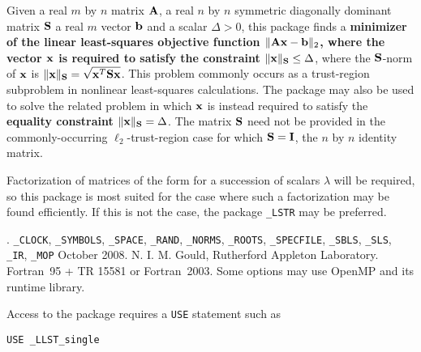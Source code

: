 \documentclass{galahad}
\newcommand{\packagename}{LLST}
\newcommand{\fullpackagename}{\libraryname\_\packagename}
\begin{document}
\galheader


\galsummary
Given a real $m$ by $n$ matrix ${\mathbf{A}}$,
a real $n$ by $n$ symmetric diagonally dominant matrix ${\mathbf{S}}$  
a real $m$ vector ${\mathbf{b}}$ and a scalar $\Delta>0$, this package finds a
{\bf minimizer of the linear least-squares objective function  
$\| {\mathbf{A}} {\mathbf{x}}  - {\mathbf{b}} \|_2$, where the vector ${\mathbf{x}}$ is  
required to satisfy the constraint $\|{\mathbf{x}}\|_{{\mathbf{S}}} \leq  \Delta$},
where the ${\mathbf{S}}$-norm of ${\mathbf{x}}$ is $\|{\mathbf{x}}\|_{{\mathbf{S}}} = \sqrt{{\mathbf{x}}^T {\mathbf{S}} {\mathbf{x}}}$. 
This problem commonly occurs as a trust-region subproblem in nonlinear 
least-squares calculations. 
The package may also be used to solve the related problem in which ${\mathbf{x}}$ is 
instead required to satisfy the 
{\bf equality constraint $\|{\mathbf{x}}\|_{{\mathbf{S}}} = \Delta$}.
The matrix ${\mathbf{S}}$ need not be provided in the commonly-occurring 
$\ell_2$-trust-region case for which ${\mathbf{S}} = {\mathbf{I}}$, the $n$ by $n$ 
identity matrix.

\noindent
Factorization of matrices of the form
for a succession
of scalars $\lambda$ will be required, so this package is most suited
for the case where such a factorization may be found efficiently. If
this is not the case, the package {\tt \libraryname\_LSTR} may be preferred.



\galattributes
\galversions{\tt  \fullpackagename\_single, \fullpackagename\_double}.
\galuses 
{\tt \libraryname\_CLOCK}, 
{\tt \libraryname\_SY\-M\-BOLS}, 
{\tt \libraryname\_SPACE}, {\tt \libraryname\_\-RAND}, 
{\tt \libraryname\_\-NORMS}, 
{\tt \libraryname\_ROOTS}, {\tt \libraryname\_SPECFILE},
{\tt \libraryname\_SBLS}, 
{\tt \libraryname\_SLS}, {\tt \libraryname\_IR},
{\tt \libraryname\_MOP}
\galdate October 2008.
\galorigin N. I. M. Gould, Rutherford Appleton Laboratory.
\gallanguage Fortran~95 + TR 15581 or Fortran~2003. 
\galparallelism Some options may use OpenMP and its runtime library.


\galhowto

Access to the package requires a {\tt USE} statement such as

\medskip{}

\hskip0.5in {\tt USE \fullpackagename\_single}
\end{document}
